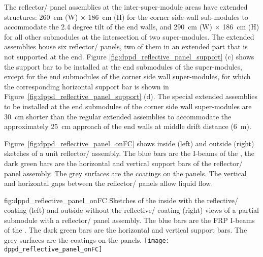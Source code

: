 The reflector/ panel assemblies at the inter-super-module areas  have extended structures: \SI{260}{\cm} (W) $\times$ \SI{186}{\cm} (H) for the corner side wall  sub-modules to accommodate the \num{2.4} degree tilt of the end walls, and \SI{290}{\cm} (W) $\times$ \SI{186}{\cm} (H) for all other  submodules at the intersection of two  super-modules. The extended assemblies house six reflector/ panels, two of them in an extended part that is not supported at the end. Figure \ref{fig:dppd_reflective_panel_support} (c) shows the support bar to be installed at the end submodules of the  super-modules, except for the end submodules of the corner  side wall super-modules, for which the corresponding horizontal support bar is shown in Figure~\ref{fig:dppd_reflective_panel_support} (d). The special extended assemblies to be installed at the end submodules of the corner side wall super-modules are \SI{30}{\cm} shorter than the regular extended assemblies to accommodate the approximately \SI{25}{\cm} approach of the end walls at middle drift distance (\SI{6}{\m}).

Figure~\ref{fig:dppd_reflective_panel_onFC} shows inside (left) and outside (right) sketches of a unit reflector/ assembly. The blue bars are the I-beams of the , the dark green bars are the horizontal and vertical support bars of the reflector/ panel assembly. The grey surfaces are the  coatings on the panels. The vertical and horizontal gaps between the reflector/ panels allow liquid flow. 

\begin{dunefigure}{fig:dppd_reflective_panel_onFC}
{Sketches of the inside with the reflective/ coating (left) and outside without the reflective/ coating (right) views of a partial  submodule with a reflector/ panel assembly. The blue bars are the FRP I-beams of the . The dark green bars are the horizontal and vertical support bars. The grey surfaces are the  coatings on the panels.}
\texttt{[image: dppd\_reflective\_panel\_onFC]}
\end{dunefigure}
